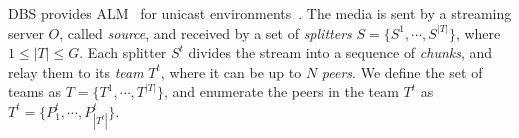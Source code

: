 DBS provides ALM~\cite{banerjee2002scalable} for unicast
environments~\cite{comer2003computer}. The media is sent by a
streaming server $O$, called \emph{source}, and received by a set
of \emph{splitters} $S=\{S^1,\cdots,S^{|T|}\}$, where $1\leq |T|\leq
G$. Each splitter $S^t$ divides the stream into a sequence
of \emph{chunks}, and relay them to its \emph{team} $T^t$, where it
can be up to $N$ \emph{peers}. We define the set of teams as
$T=\{T^1,\cdots,T^{|T|}\}$, and enumerate the peers in the team $T^t$
as $T^t=\{P^t_1,\cdots,P^t_{|T^t|}\}$.

